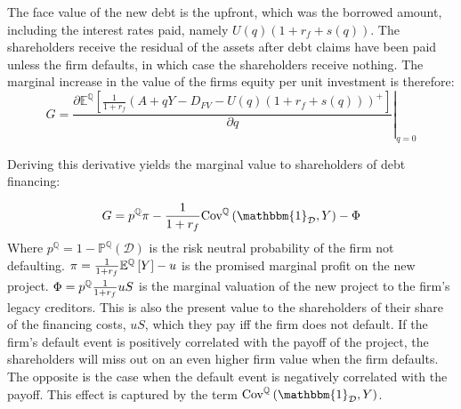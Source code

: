 \documentclass[../main.tex]{subfiles}
\begin{document}
        The face value of the new debt is the upfront, which was the borrowed amount, 
        including the interest rates paid, namely 
        $U(q)(1 + r_{f} + s(q))$. 
        The shareholders receive the residual of the assets after debt claims have been paid
        unless the firm defaults, in which case the shareholders receive nothing. 
        The marginal increase in the value of the firms equity per unit investment is therefore:
            \begin{equation}
                G = 
                \left.
                \frac{
                    \partial 
                    \mathbb{E}^{\mathbb{Q}}\left[
                        \frac{1}{1+r_{f}} 
                        \left(
                            A + qY - D_{FV} - U(q)(1 + r_{f} + s(q))
                        \right)^{+}
                    \right] 
                }{
                    \partial 
                    q
                }
                \right\rvert_{q=0} 
            \end{equation}
        

        Deriving this derivative yields the marginal value to shareholders of debt financing:

            \begin{equation}
                G = 
                    p^{\mathbb{Q}}\pi 
                    - \discountfactor  \text{Cov}^{\mathbb{Q}}\left(\mathbbm{1}_{\mathcal{D}}, Y\right) - \Phi
                    \label{eqt:marginal-shareholder-value-debt-financing}
            \end{equation}
        Where $p^{\mathbb{Q}} = 1 - \mathbb{P}^{\mathbb{Q}}\left(\mathcal{D}\right)$ is the risk neutral probability of the firm not defaulting. 
        $\pi = \frac{1}{1 + r_{f}} \mathbb{E}^{\mathbb{Q}}\left[Y\right] - u$ 
        is the promised marginal profit on the new project. 
        $\Phi = p^{\mathbb{Q}} \frac{1}{1 + r_{f}} u S$
        is the marginal valuation of the new project to the firm's legacy creditors. 
        This is also the present value to the shareholders of their share of the financing costs, $uS$,
        which they pay iff the firm does not default. 
        If the firm's default event is positively correlated with the payoff of the project,
        the shareholders will miss out on an even higher firm value when the firm defaults.
        The opposite is the case when the default event is negatively correlated with the payoff.
        This effect is captured by the term 
        $\text{Cov}^{\mathbb{Q}}\left(\mathbbm{1}_{\mathcal{D}}, Y\right)$.
\end{document}
